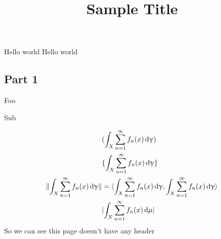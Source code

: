 \documentclass{article}
\title{Sample Title}
\newcommand\bigstuff[1]{\int_X \sum_{n=1}^\infty f_n(x) \, \mathrm{d} #1}
\begin{document}
 Hello world
 Hello world
\subsection{Part 1}
\begin{dzenum}
  \item Foo
  \item
    \begin{dzenum}
      \item Sub
      \item
    \end{dzenum}
\end{dzenum}
\pagehline
\begin{align*}
  &\parens{\bigstuff{\gamma}} \\
  &\braces{\bigstuff{\gamma*}} \\
  \norm{\bigstuff{\gamma}} &= \iprod{\bigstuff{\gamma*}}{\bigstuff{\gamma}} \\
  &\abs{\bigstuff{\mu}}
\end{align*}
\newpage
So we can see this page doesn't have any header
\newpage
\end{document}
